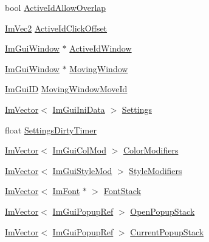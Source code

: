 \begin{DoxyCompactItemize}
\item 
bool \mbox{\hyperlink{struct_im_gui_context_ab3234556023eabcfed157b79ba4c5869}{Active\+Id\+Allow\+Overlap}}
\item 
\mbox{\hyperlink{struct_im_vec2}{Im\+Vec2}} \mbox{\hyperlink{struct_im_gui_context_a28afb4e9b4ac155825f4b4c94cdc516c}{Active\+Id\+Click\+Offset}}
\item 
\mbox{\hyperlink{struct_im_gui_window}{Im\+Gui\+Window}} $\ast$ \mbox{\hyperlink{struct_im_gui_context_a95a35b5d82d3fdea28b71580dc6a9618}{Active\+Id\+Window}}
\item 
\mbox{\hyperlink{struct_im_gui_window}{Im\+Gui\+Window}} $\ast$ \mbox{\hyperlink{struct_im_gui_context_a28078cc22f615213fd8544016cd6ae20}{Moving\+Window}}
\item 
\mbox{\hyperlink{imgui_8h_a1785c9b6f4e16406764a85f32582236f}{Im\+Gui\+ID}} \mbox{\hyperlink{struct_im_gui_context_abfd9589ba8b4d6b78bd24d46696ed820}{Moving\+Window\+Move\+Id}}
\item 
\mbox{\hyperlink{class_im_vector}{Im\+Vector}}$<$ \mbox{\hyperlink{struct_im_gui_ini_data}{Im\+Gui\+Ini\+Data}} $>$ \mbox{\hyperlink{struct_im_gui_context_ad7786303f4a54b3dc702e4e646a10bad}{Settings}}
\item 
float \mbox{\hyperlink{struct_im_gui_context_a7e0dd3aef4a4f0fd85ed39e13824f2ab}{Settings\+Dirty\+Timer}}
\item 
\mbox{\hyperlink{class_im_vector}{Im\+Vector}}$<$ \mbox{\hyperlink{struct_im_gui_col_mod}{Im\+Gui\+Col\+Mod}} $>$ \mbox{\hyperlink{struct_im_gui_context_aeb58091b545cc794c99487b8e66daf43}{Color\+Modifiers}}
\item 
\mbox{\hyperlink{class_im_vector}{Im\+Vector}}$<$ \mbox{\hyperlink{struct_im_gui_style_mod}{Im\+Gui\+Style\+Mod}} $>$ \mbox{\hyperlink{struct_im_gui_context_ac0feba14c36c7dff87211c3650815be7}{Style\+Modifiers}}
\item 
\mbox{\hyperlink{class_im_vector}{Im\+Vector}}$<$ \mbox{\hyperlink{struct_im_font}{Im\+Font}} $\ast$ $>$ \mbox{\hyperlink{struct_im_gui_context_a8a6a9f23604fe0d0b51c78e45e4432b0}{Font\+Stack}}
\item 
\mbox{\hyperlink{class_im_vector}{Im\+Vector}}$<$ \mbox{\hyperlink{struct_im_gui_popup_ref}{Im\+Gui\+Popup\+Ref}} $>$ \mbox{\hyperlink{struct_im_gui_context_af6c0e07cff9641d31bdf22b7e7df2842}{Open\+Popup\+Stack}}
\item 
\mbox{\hyperlink{class_im_vector}{Im\+Vector}}$<$ \mbox{\hyperlink{struct_im_gui_popup_ref}{Im\+Gui\+Popup\+Ref}} $>$ \mbox{\hyperlink{struct_im_gui_context_a7b2472ca52bcccb98e0db1a8b1b78853}{Current\+Popup\+Stack}}

\end{DoxyCompactItemize}
